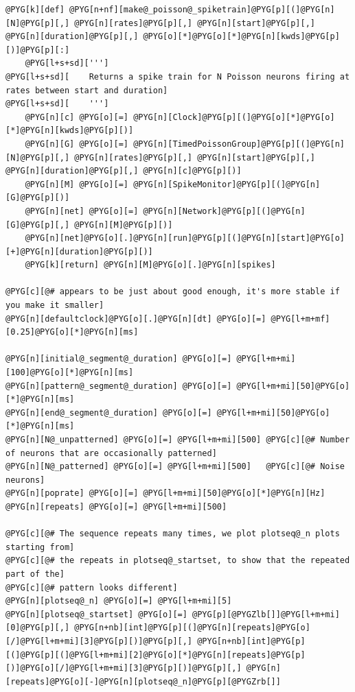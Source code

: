 \documentclass[letterpaper,10pt,english]{manual}
\begin{document}
\begin{Verbatim}[commandchars=@\[\]]
@PYG[k][def] @PYG[n+nf][make@_poisson@_spiketrain]@PYG[p][(]@PYG[n][N]@PYG[p][,] @PYG[n][rates]@PYG[p][,] @PYG[n][start]@PYG[p][,] @PYG[n][duration]@PYG[p][,] @PYG[o][*]@PYG[o][*]@PYG[n][kwds]@PYG[p][)]@PYG[p][:]
    @PYG[l+s+sd][''']
@PYG[l+s+sd][    Returns a spike train for N Poisson neurons firing at rates between start and duration]
@PYG[l+s+sd][    ''']
    @PYG[n][c] @PYG[o][=] @PYG[n][Clock]@PYG[p][(]@PYG[o][*]@PYG[o][*]@PYG[n][kwds]@PYG[p][)]
    @PYG[n][G] @PYG[o][=] @PYG[n][TimedPoissonGroup]@PYG[p][(]@PYG[n][N]@PYG[p][,] @PYG[n][rates]@PYG[p][,] @PYG[n][start]@PYG[p][,] @PYG[n][duration]@PYG[p][,] @PYG[n][c]@PYG[p][)]
    @PYG[n][M] @PYG[o][=] @PYG[n][SpikeMonitor]@PYG[p][(]@PYG[n][G]@PYG[p][)]
    @PYG[n][net] @PYG[o][=] @PYG[n][Network]@PYG[p][(]@PYG[n][G]@PYG[p][,] @PYG[n][M]@PYG[p][)]
    @PYG[n][net]@PYG[o][.]@PYG[n][run]@PYG[p][(]@PYG[n][start]@PYG[o][+]@PYG[n][duration]@PYG[p][)]
    @PYG[k][return] @PYG[n][M]@PYG[o][.]@PYG[n][spikes]

@PYG[c][@# appears to be just about good enough, it's more stable if you make it smaller]
@PYG[n][defaultclock]@PYG[o][.]@PYG[n][dt] @PYG[o][=] @PYG[l+m+mf][0.25]@PYG[o][*]@PYG[n][ms]

@PYG[n][initial@_segment@_duration] @PYG[o][=] @PYG[l+m+mi][100]@PYG[o][*]@PYG[n][ms]
@PYG[n][pattern@_segment@_duration] @PYG[o][=] @PYG[l+m+mi][50]@PYG[o][*]@PYG[n][ms]
@PYG[n][end@_segment@_duration] @PYG[o][=] @PYG[l+m+mi][50]@PYG[o][*]@PYG[n][ms]
@PYG[n][N@_unpatterned] @PYG[o][=] @PYG[l+m+mi][500] @PYG[c][@# Number of neurons that are occasionally patterned]
@PYG[n][N@_patterned] @PYG[o][=] @PYG[l+m+mi][500]   @PYG[c][@# Noise neurons]
@PYG[n][poprate] @PYG[o][=] @PYG[l+m+mi][50]@PYG[o][*]@PYG[n][Hz]
@PYG[n][repeats] @PYG[o][=] @PYG[l+m+mi][500]

@PYG[c][@# The sequence repeats many times, we plot plotseq@_n plots starting from]
@PYG[c][@# the repeats in plotseq@_startset, to show that the repeated part of the]
@PYG[c][@# pattern looks different]
@PYG[n][plotseq@_n] @PYG[o][=] @PYG[l+m+mi][5]
@PYG[n][plotseq@_startset] @PYG[o][=] @PYG[p][@PYGZlb[]]@PYG[l+m+mi][0]@PYG[p][,] @PYG[n+nb][int]@PYG[p][(]@PYG[n][repeats]@PYG[o][/]@PYG[l+m+mi][3]@PYG[p][)]@PYG[p][,] @PYG[n+nb][int]@PYG[p][(]@PYG[p][(]@PYG[l+m+mi][2]@PYG[o][*]@PYG[n][repeats]@PYG[p][)]@PYG[o][/]@PYG[l+m+mi][3]@PYG[p][)]@PYG[p][,] @PYG[n][repeats]@PYG[o][-]@PYG[n][plotseq@_n]@PYG[p][@PYGZrb[]]


\end{Verbatim}
\end{document}

